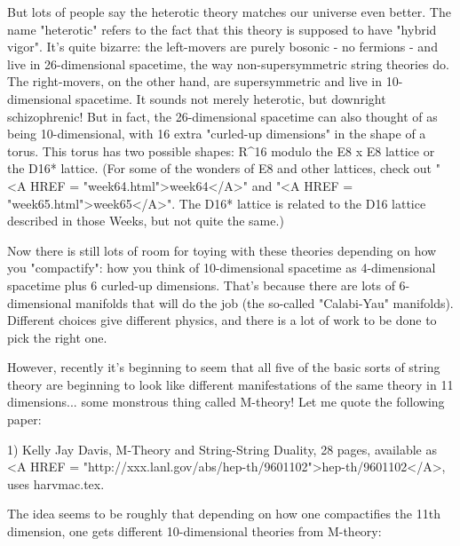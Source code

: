 But lots of people say the heterotic theory matches our universe even
better.  The name "heterotic" refers to the fact that this theory is
supposed to have "hybrid vigor".  It's quite bizarre: the left-movers
are purely bosonic - no fermions - and live in 26-dimensional
spacetime, the way non-supersymmetric string theories do.  The
right-movers, on the other hand, are supersymmetric and live in 10-
dimensional spacetime.  It sounds not merely heterotic, but downright
schizophrenic!  But in fact, the 26-dimensional spacetime can also thought of
as being 10-dimensional, with 16 extra "curled-up dimensions" in the
shape of a torus.  This torus has two possible shapes:
R^16 modulo the E8 x E8 lattice or the D16* lattice.  
(For some of the wonders of
E8 and other lattices, check out 
"<A HREF = "week64.html">week64</A>" and "<A HREF = "week65.html">week65</A>".  The D16* lattice is related to the D16 lattice
described in those Weeks, but not quite the same.)

Now there is still lots of room for toying with these theories
depending on how you "compactify": how you think of 10-dimensional
spacetime as 4-dimensional spacetime plus 6 curled-up dimensions.
That's because there are lots of 6-dimensional manifolds that will do
the job (the so-called "Calabi-Yau" manifolds).  Different choices give
different physics, and there is a lot of work to be done to pick the
right one.  

However, recently it's beginning to seem that all five of the basic
sorts of string theory are beginning to look like different
manifestations of the same theory in 11 dimensions... some monstrous
thing called M-theory!  Let me quote the following paper:

1) Kelly Jay Davis, M-Theory and String-String Duality, 28 pages,
available as <A HREF = "http://xxx.lanl.gov/abs/hep-th/9601102">hep-th/9601102</A>, uses harvmac.tex.

The idea seems to be roughly that depending on how one compactifies the
11th dimension, one gets different 10-dimensional theories from
M-theory:

